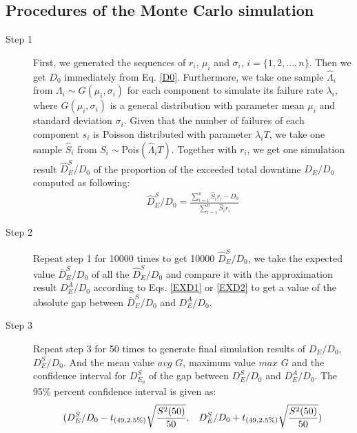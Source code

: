 \documentclass[preprint,12pt]{elsarticle}
\begin{document}
\begin{appendices}


\section{Procedures of the Monte Carlo simulation}
\label{MCP}
\begin{description}
\item[Step 1]
First, we generated the sequences of $r_{i}$, $\mu_{i}$ and $\sigma_{i}$, $i=\{1,2,...,n\}$. Then we get $D_0$ immediately from Eq. \eqref{D0}. Furthermore, we take one sample $\hat{\Lambda}_{i}$ from $\Lambda_{i} \sim G(\mu_{i},\sigma_{i})$ for each component to simulate its failure rate $\lambda_{i}$, where $G(\mu_{i},\sigma_{i})$ is a general distribution with parameter mean $\mu_{i}$ and standard deviation $\sigma_{i}$. Given that the number of failures of each component $s_{i}$ is Poisson distributed with parameter $\lambda_{i}T$, we take one sample $\hat{S}_{i}$ from $S_{i}\sim$Pois$(\hat{\Lambda}_{i}T)$. Together with $r_{i}$, we get one simulation result $\hat{D}_{E}^{S}/D_{0}$ of the proportion of the exceeded total downtime $D_{E}/D_0$ computed as following:
\begin{eqnarray}
\hat{D}_{E}^{S}/D_{0}=\frac{\sum_{i=1}^{n}{\hat{S}_{i}r_{i}}-D_0}{\sum_{i=1}^{n}{\hat{S}_{i}r_{i}}}
\end{eqnarray}

\item[Step 2]

Repeat step 1 for 10000 times to get 10000 $\hat{D}_{E}^{S}/D_{0}$, we take the expected value $\bar{D}_{E}^{S}/D_{0}$ of all the $\hat{D}_{E}^{S}/D_{0}$ and compare it with the approximation result $D_{E}^{A}/D_{0}$ according to Eqs. \eqref{EXD1} or \eqref{EXD2}  to get a value of the absolute gap between $\bar{D}_{E}^{S}/D_{0}$ and $D_{E}^{A}/D_{0}$.

\item[Step 3]

Repeat step 3 for 50 times to generate final simulation results of $D_{E}/D_{0}$, $D_{E}^{S}/D_{0}$. And the mean value $avg$ $G$, maximum value $max$ $G$ and the confidence interval for $D_{E_{p}}^{S}$ of the gap between $D_{E}^{S}/D_{0}$ and $D_{E}^{A}/D_{0}$. The 95\% percent confidence interval is given as:
$$(D_{E}^{S}/D_{0}-t_{(49,2.5\%)}\sqrt{\frac{S^{2}(50)}{50}},\hspace{3mm}D_{E}^{S}/D_{0}+t_{(49,2.5\%)}\sqrt{\frac{S^{2}(50)}{50}} ) $$

\end{description}


\end{appendices}
\end{document}
